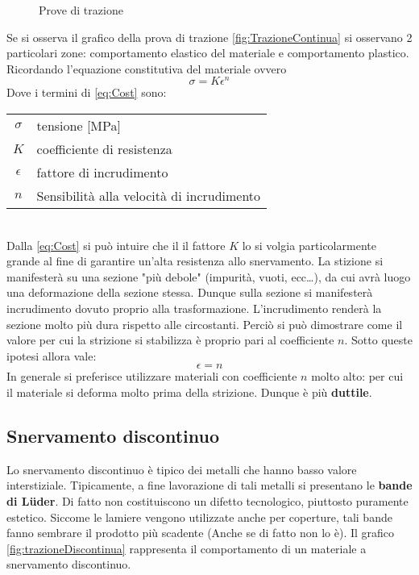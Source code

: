 \begin{figure}
\centering
{} \quad
{}
\caption{Prove di trazione}\label{fig:Trazione}
\end{figure}
Se si osserva il grafico della prova di trazione \ref{fig:TrazioneContinua}
si osservano 2 particolari zone: comportamento elastico del materiale e comportamento plastico.
Ricordando l'equazione constitutiva del materiale ovvero
\begin{equation}
\sigma = K \epsilon ^n
\label{eq:Cost}
\end{equation}
Dove i termini di \ref{eq:Cost} sono:\\
\begin{tabular}{cl}
$\sigma$ & tensione [MPa]\\
$K$ & coefficiente di resistenza\\
$\epsilon$ & fattore di incrudimento\\
$n$ & Sensibilità alla velocità di incrudimento\\
\end{tabular}
\\
Dalla \ref{eq:Cost} si può intuire che il il fattore $K$ lo si volgia particolarmente grande al fine di garantire un'alta resistenza allo snervamento.
La stizione si manifesterà su una sezione "più debole" (impurità, vuoti, ecc\dots), da cui avrà luogo una deformazione della sezione stessa. Dunque sulla sezione si manifesterà incrudimento dovuto proprio alla trasformazione.
L'incrudimento renderà la sezione molto più dura rispetto alle circostanti. Perciò si può dimostrare come il valore per cui la strizione si stabilizza è proprio pari al coefficiente $n$.
Sotto queste ipotesi allora vale:
\begin{equation}
\epsilon = n
\label{eq:StrizzCost}
\end{equation}
In generale si preferisce utilizzare materiali con coefficiente $n$ molto alto: per cui il materiale 
si deforma molto prima della strizione. Dunque è più \textbf{duttile}.

\subsection{Snervamento discontinuo}
Lo snervamento discontinuo è tipico dei metalli che hanno basso valore interstiziale.
Tipicamente, a fine lavorazione di tali metalli si presentano le \textbf{bande di Lüder}. Di fatto non costituiscono un difetto tecnologico, piuttosto puramente estetico. Siccome le lamiere vengono utilizzate anche per coperture, tali bande fanno sembrare il prodotto più scadente (Anche se di fatto non lo è).
Il grafico \ref{fig:trazioneDiscontinua} rappresenta il comportamento di un materiale a snervamento discontinuo.

